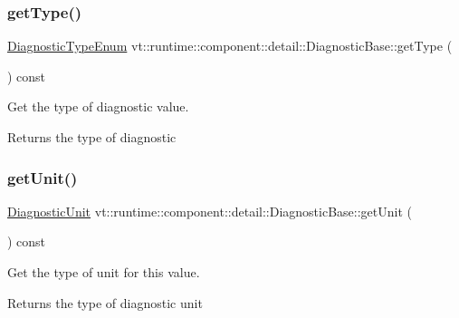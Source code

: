 \subsubsection{\texorpdfstring{get\+Type()}{getType()}}
{\footnotesize\ttfamily \hyperlink{namespacevt_1_1runtime_1_1component_af0bb99d9a054682217874bdc735ecac0}{Diagnostic\+Type\+Enum} vt\+::runtime\+::component\+::detail\+::\+Diagnostic\+Base\+::get\+Type (\begin{DoxyParamCaption}{ }\end{DoxyParamCaption}) const\hspace{0.3cm}{\ttfamily [inline]}}



Get the type of diagnostic value. 

\begin{DoxyReturn}{Returns}
the type of diagnostic 
\end{DoxyReturn}
\mbox{\label{structvt_1_1runtime_1_1component_1_1detail_1_1_diagnostic_base_aae529e6a682145fa59f90bcea0d5e6d8}} 
\subsubsection{\texorpdfstring{get\+Unit()}{getUnit()}}
{\footnotesize\ttfamily \hyperlink{namespacevt_1_1runtime_1_1component_a99ec18b08862c712176126bb7d0e307a}{Diagnostic\+Unit} vt\+::runtime\+::component\+::detail\+::\+Diagnostic\+Base\+::get\+Unit (\begin{DoxyParamCaption}{ }\end{DoxyParamCaption}) const\hspace{0.3cm}{\ttfamily [inline]}}



Get the type of unit for this value. 

\begin{DoxyReturn}{Returns}
the type of diagnostic unit 
\end{DoxyReturn}
\mbox{\label{structvt_1_1runtime_1_1component_1_1detail_1_1_diagnostic_base_a8e43c10002b63cd3d3192103dcf44727}} 
